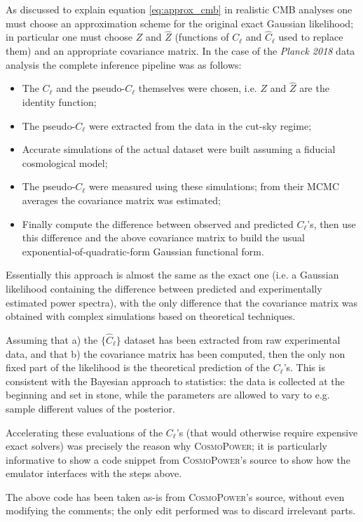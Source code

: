 As discussed to explain equation \eqref{eq:approx_cmb} in realistic CMB analyses one must choose an approximation scheme for the original exact Gaussian likelihood; in particular one must choose $Z$ and $\hat{Z}$ (functions of $C_\ell$ and $\hat{C}_\ell$ used to replace them) and an appropriate covariance matrix. 
In the case of the \emph{Planck 2018} data analysis \cite{planck_2018} the complete inference pipeline was as follows:
\begin{itemize}
    \item The $C_\ell$ and the pseudo-$C_\ell$ themselves were chosen, i.e. $Z$ and $\hat{Z}$ are the identity function;
    \item The pseudo-$C_\ell$ were extracted from the data in the cut-sky regime;
    \item Accurate simulations of the actual dataset were built assuming a fiducial cosmological model;
    \item The pseudo-$C_\ell$ were measured using these simulations; from their MCMC averages the covariance matrix was estimated;
    \item Finally compute the difference between observed and predicted $C_\ell$'s, then use this difference and the above covariance matrix to build the usual exponential-of-quadratic-form Gaussian functional form.
\end{itemize}
Essentially this approach is almost the same as the exact one (i.e. a Gaussian likelihood containing the difference between predicted and experimentally estimated power spectra), with the only difference that the covariance matrix was obtained with complex simulations based on theoretical techniques.

Assuming that a) the $\{\hat{C}_\ell\}$ dataset has been extracted from raw experimental data, and that b) the covariance matrix has been computed, then the only non fixed part of the likelihood is the theoretical prediction of the $C_\ell$'s.
This is consistent with the Bayesian approach to statistics: the data is collected at the beginning and set in stone, while the parameters are allowed to vary to e.g. sample different values of the posterior. 

Accelerating these evaluations of the $C_\ell$'s (that would otherwise require expensive exact solvers) was precisely the reason why \textsc{CosmoPower}; it is particularly informative to show a code snippet from \textsc{CosmoPower}'s source to show how the emulator interfaces with the steps above.

The above code has been taken as-is from \textsc{CosmoPower}'s source, without even modifying the comments; the only edit performed was to discard irrelevant parts.

